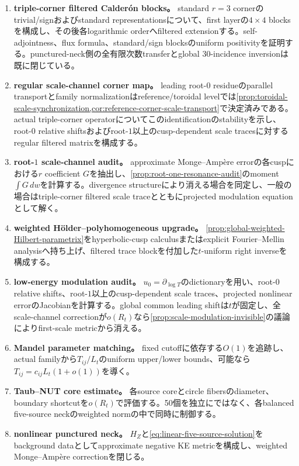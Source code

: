 \documentclass[11pt,a4paper]{ltjsarticle}
\theoremstyle{definition}
\theoremstyle{remark}
\begin{document}
\begin{enumerate}[label=\textbf{P\arabic*.},leftmargin=3.2em,itemsep=2mm]
\item \textbf{triple-corner filtered Calder\'on blocks。} standard $r=3$ cornerのtrivial/signおよびstandard representationsについて、first layerの$4\times4$ blocksを構成し、その後各logarithmic orderへfiltered extensionする。self-adjointness、flux formula、standard/sign blocksのuniform positivityを証明する。punctured-neck側の全有限次数transferとglobal 30-incidence inversionは既に閉じている。
\item \textbf{regular scale-channel corner map。} leading root-$0$ residueのparallel transportとfamily normalizationはreference/toroidal levelでは\cref{prop:toroidal-scale-synchronization,cor:reference-corner-scale-transport}で決定済みである。actual triple-corner operatorについてこのidentificationのstabilityを示し、root-$0$ relative shiftsおよびroot-$1$以上のcusp-dependent scale tracesに対するregular filtered matrixを構成する。
\item \textbf{root-$1$ scale-channel audit。} approximate Monge--Amp\`ere errorの各cuspにおける$r$ coefficient $G$を抽出し、\cref{prop:root-one-resonance-audit}のmoment $\int G\,dw$を計算する。divergence structureにより消える場合を同定し、一般の場合はtriple-corner filtered scale traceとともにprojected modulation equationとして解く。
\item \textbf{weighted Hölder--polyhomogeneous upgrade。} \cref{prop:global-weighted-Hilbert-parametrix}をhyperbolic-cusp calculusまたはexplicit Fourier--Mellin analysisへ持ち上げ、filtered trace blockを付加した$t$-uniform right inverseを構成する。
\item \textbf{low-energy modulation audit。} $u_0=\partial_{\log T}$のdictionaryを用い、root-$0$ relative shifts、root-$1$以上のcusp-dependent scale traces、projected nonlinear errorのJacobianを計算する。global common leading shiftは$t$が固定し、全scale-channel correctionが$o(R_t)$なら\cref{prop:scale-modulation-invisible}の議論によりfirst-scale metricから消える。
\item \textbf{Mandel parameter matching。} fixed cutoffに依存する$O(1)$を追跡し、actual familyから$T_{ij}/L_t$のuniform upper/lower bounds、可能なら$T_{ij}=c_{ij}L_t(1+o(1))$を導く。
\item \textbf{Taub--NUT core estimate。} 各source coreとcircle fibersのdiameter、boundary shortcutを$o(R_t)$で評価する。50個を独立にではなく、各balanced five-source neckのweighted normの中で同時に制御する。
\item \textbf{nonlinear punctured neck。} $H_Z$と\eqref{eq:linear-five-source-solution}をbackground dataとしてapproximate negative KE metricを構成し、weighted Monge--Ampère correctionを閉じる。

\end{enumerate}
\end{document}
